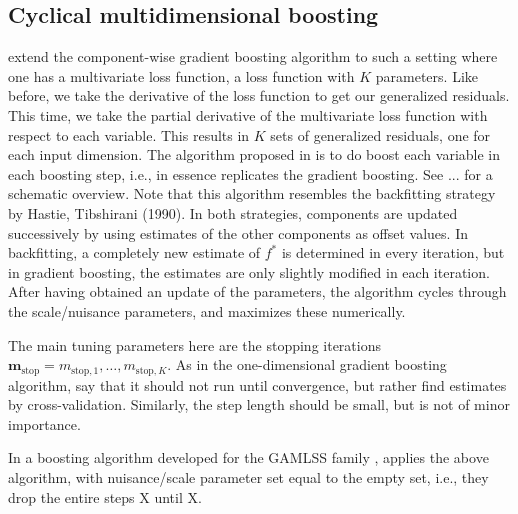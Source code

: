 \subsection{Cyclical multidimensional boosting}
\citet{schmid} extend the component-wise gradient boosting algorithm \citep{friedman2001} to such a setting where one has a multivariate loss function, a loss function with $K$ parameters. Like before, we take the derivative of the loss function to get our generalized residuals. This time, we take the partial derivative of the multivariate loss function with respect to each variable. This results in $K$ sets of generalized residuals, one for each input dimension. %
The algorithm proposed in \citet{schmid} is to do boost each variable in each boosting step, i.e.,    in essence replicates the gradient boosting. See ... for a schematic overview. Note that this algorithm resembles the backfitting strategy by Hastie, Tibshirani (1990). In both strategies, components are updated successively by using estimates of the other components as offset values. In backfitting, a completely new estimate of $f^*$ is determined in every iteration, but in gradient boosting, the estimates are only slightly modified in each iteration. After having obtained an update of the parameters, the algorithm cycles through the scale/nuisance parameters, and maximizes these numerically.

The main tuning parameters here are the stopping iterations $\mathbf{m}_{\text{stop}}=m_{\text{stop},1},\ldots,m_{\text{stop},K}$. As in the one-dimensional gradient boosting algorithm, \citet{schmid} say that it should not run until convergence, but rather find estimates by cross-validation. Similarly, the step length should be small, but is not of minor importance.

In a boosting algorithm developed for the GAMLSS family \citep{gamlss}, \citet{gamboostlss-paper} applies the above algorithm, with nuisance/scale parameter set equal to the empty set, i.e., they drop the entire steps X until X.

